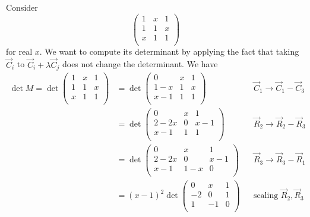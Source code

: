 \documentclass{../template/note}
\begin{document}
    \begin{example}
        Consider
        \[
            \begin{pmatrix}
             1 & x & 1 \\
             1 & 1 & x \\
             x & 1 & 1 \\
            \end{pmatrix}
        \]
        for real \(x\). We want to compute its determinant by applying the fact that taking \(\vec C_i\) to \(\vec C_i + \lambda \vec C_j\) does not change the determinant. We have
        \begin{align*}
            \det M = \det \begin{pmatrix}
             1 & x & 1 \\
             1 & 1 & x \\
             x & 1 & 1 \\
            \end{pmatrix} &= \det \begin{pmatrix}
             0 & x & 1 \\
             1-x & 1 & x \\
             x-1 & 1 & 1 \\
            \end{pmatrix} && \vec C_1 \to \vec C_1 - \vec C_3 \\
            &= \det \begin{pmatrix}
             0 & x & 1 \\
             2-2x & 0 & x-1 \\
             x-1 & 1 & 1 \\
            \end{pmatrix} && \vec R_2 \to \vec R_2 - \vec R_3 \\
            &= \det \begin{pmatrix}
             0 & x & 1 \\
             2-2x & 0 & x-1 \\
             x-1 & 1-x & 0 \\
            \end{pmatrix} && \vec R_3 \to \vec R_3 - \vec R_1 \\
            &= (x-1)^2 \det \begin{pmatrix}
             0 & x & 1 \\
             -2 & 0 & 1 \\
             1 & -1 & 0 \\
            \end{pmatrix} && \text{scaling } \vec R_2, \vec R_3 \\

\end{align*}
\end{example}
\end{document}
